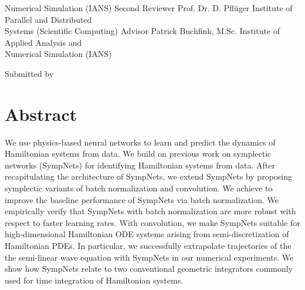 \documentclass[twoside,a4paper]{article}
\begin{document}
\begin{titlePageST}
\begin{supervisorST}{3}
{Numerical Simulation (IANS)}%
\addSuper%
{Second Reviewer}%
{Prof. Dr. D. Pflüger}%
{Institute of Parallel and Distributed\\[-0.2cm]
Systems (Scientific Computing)}%
\addSuper%
{Advisor}%
{Patrick Buchfink, M.Sc.}%
{Institute of Applied Analysis and\\[-0.2cm]
Numerical Simulation (IANS)}%
\end{supervisorST}%
\vspace{80pt}%
\begin{authorST}{Submitted by}%
\end{authorST}%
\end{titlePageST}
\clearpage
\newpage\thispagestyle{plain}\null
\newpage\thispagestyle{plain}

%
%
\section*{Abstract}
We use physics-based neural networks to learn and predict the dynamics 
of Hamiltonian systems from data.
We build on previous work on symplectic networks (SympNets) for
identifying Hamiltonian systems from data. After recapitulating the 
architecture of SympNets, we extend SympNets by 
proposing symplectic variants of batch normalization and convolution. We achieve 
to improve the baseline performance of SympNets via batch normalization. 
We empirically verify that SympNets with batch normalization are more robust
with respect to faster learning rates.
With convolution,
we make SympNets suitable for high-dimensional Hamiltonian ODE systems arising from
semi-discretization of Hamiltonian PDEs. In particular, we successfully 
extrapolate trajectories of the the semi-linear wave equation with SympNets in our 
numerical experiments. We show how SympNets relate to two conventional geometric 
integrators commonly used for time integration of Hamiltonian systems.
\clearpage
\newpage\thispagestyle{plain}\null
\newpage\thispagestyle{plain}

%
%
\end{document}
